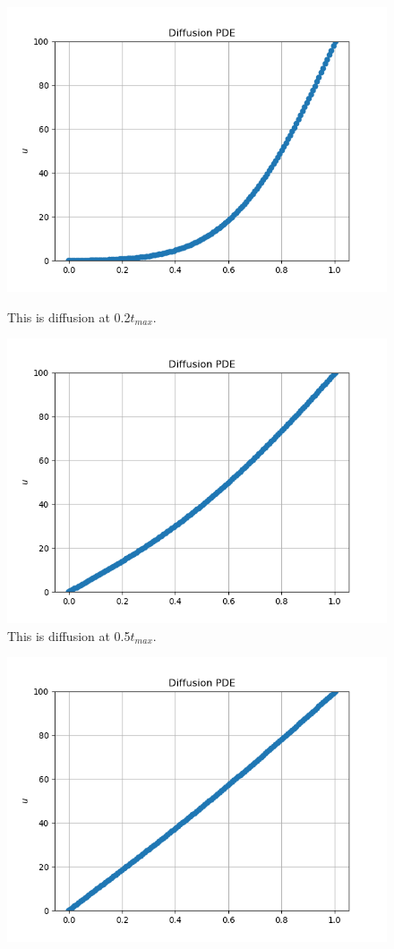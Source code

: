 \documentclass[12pt]{article}
\begin{document}
\begin{enumerate}[label=(\alph*)]
		
	\begin{figure}[htb]
		\centering
		\begin{minipage}[c]{0.48\textwidth}
			\centering
			\includegraphics[width=0.7\linewidth]{./PDE/figures/diffusion_128_upwind/result_diffusion_128_upwind_1.png}
			\caption{This is diffusion at 0.2$t_{max}$.}
			\label{fig:diff5}
		\end{minipage}
		\hspace{0.1in}
		\begin{minipage}[c]{0.48\textwidth}
			\centering
			\includegraphics[width=0.7\linewidth]{./PDE/figures/diffusion_128_upwind/result_diffusion_128_upwind_4.png}
			\caption{This is diffusion at 0.5$t_{max}$.}
			\label{fig:diff6}
		\end{minipage}
		\newline
		\vspace{-0.2in}
	\end{figure}
	\begin{figure}[htb]
		\centering
		\begin{minipage}[c]{0.48\textwidth}
			\centering
			\includegraphics[width=0.7\linewidth]{./PDE/figures/diffusion_128_upwind/result_diffusion_128_upwind_7.png}

\end{minipage}
\end{figure}
\end{enumerate}
\end{document}
